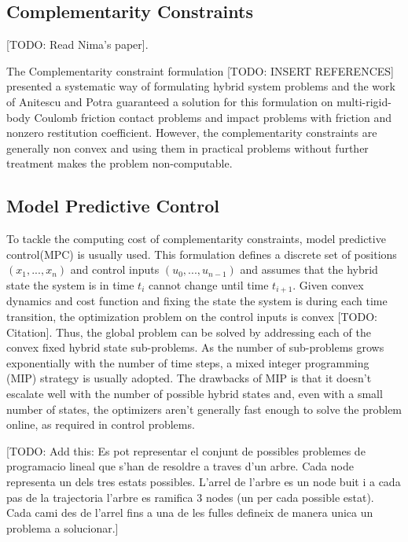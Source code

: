 \documentclass[12,twoside]{TFG-GM}
\theoremstyle{definition}
\theoremstyle{remark}
\begin{document}
\subsection{Complementarity Constraints}
\label{subsec:Complementarity Constraint}
[TODO: Read Nima's paper].

The Complementarity constraint formulation [TODO: INSERT REFERENCES] presented a systematic way of formulating hybrid system problems and the work of Anitescu and Potra \cite{lcc1} guaranteed a solution for this formulation on multi-rigid-body Coulomb friction contact problems and impact problems with friction and nonzero restitution coefficient. However, the complementarity constraints are generally non convex and using them in practical problems without further treatment makes the problem non-computable.

\subsection{Model Predictive Control}
\label{subsec:MPC}
To tackle the computing cost of complementarity constraints, model predictive control(MPC) is usually used. This formulation defines a discrete set of positions $(x_1, ..., x_n)$ and control inputs $(u_0, ..., u_{n-1})$ and assumes that the hybrid state the system is in time $t_i$ cannot change until time $t_{i+1}$. Given convex dynamics and cost function and fixing the state the system is during each time transition, the optimization problem on the control inputs is convex [TODO: Citation]. Thus, the global problem can be solved by addressing each of the convex fixed hybrid state sub-problems.
As the number of sub-problems grows exponentially with the number of time steps, a mixed integer programming (MIP) strategy is usually adopted. The drawbacks of MIP is that it doesn't escalate well with the number of possible hybrid states and, even with a small number of states, the optimizers aren't generally fast enough to solve the problem online, as required in control problems.

[TODO: Add this: Es pot representar el conjunt de possibles problemes de programacio lineal que s'han de resoldre a traves d'un arbre. Cada node representa un dels tres estats possibles. L'arrel de l'arbre es un node buit i a cada pas de la trajectoria l'arbre es ramifica 3 nodes (un per cada possible estat). Cada cami des de l'arrel fins a una de les fulles defineix de manera unica un problema a solucionar.]
\end{document}
